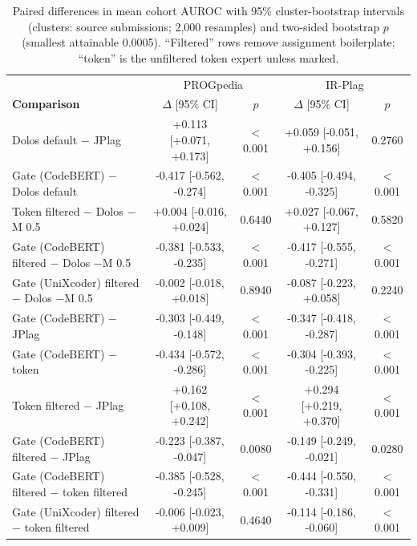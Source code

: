 \begin{table}[t]
\centering
\caption{Paired differences in mean cohort AUROC with 95\% cluster-bootstrap intervals (clusters: source submissions; 2,000 resamples) and two-sided bootstrap $p$ (smallest attainable 0.0005). ``Filtered'' rows remove assignment boilerplate; ``token'' is the unfiltered token expert unless marked.}
\label{tab:cohort-diff}
\footnotesize
\setlength{\tabcolsep}{3pt}
\begin{tabular}{l|cc|cc}
\toprule
 & \multicolumn{2}{c|}{PROGpedia} & \multicolumn{2}{c}{IR-Plag} \\
\textbf{Comparison} & $\Delta$ [95\% CI] & $p$ & $\Delta$ [95\% CI] & $p$ \\
\midrule
Dolos default $-$ JPlag & +0.113 [+0.071, +0.173] & $<$0.001 & +0.059 [-0.051, +0.156] & 0.2760 \\
Gate (CodeBERT) $-$ Dolos default & -0.417 [-0.562, -0.274] & $<$0.001 & -0.405 [-0.494, -0.325] & $<$0.001 \\
Token filtered $-$ Dolos $-$M 0.5 & +0.004 [-0.016, +0.024] & 0.6440 & +0.027 [-0.067, +0.127] & 0.5820 \\
Gate (CodeBERT) filtered $-$ Dolos $-$M 0.5 & -0.381 [-0.533, -0.235] & $<$0.001 & -0.417 [-0.555, -0.271] & $<$0.001 \\
Gate (UniXcoder) filtered $-$ Dolos $-$M 0.5 & -0.002 [-0.018, +0.018] & 0.8940 & -0.087 [-0.223, +0.058] & 0.2240 \\
Gate (CodeBERT) $-$ JPlag & -0.303 [-0.449, -0.148] & $<$0.001 & -0.347 [-0.418, -0.287] & $<$0.001 \\
Gate (CodeBERT) $-$ token & -0.434 [-0.572, -0.286] & $<$0.001 & -0.304 [-0.393, -0.225] & $<$0.001 \\
Token filtered $-$ JPlag & +0.162 [+0.108, +0.242] & $<$0.001 & +0.294 [+0.219, +0.370] & $<$0.001 \\
Gate (CodeBERT) filtered $-$ JPlag & -0.223 [-0.387, -0.047] & 0.0080 & -0.149 [-0.249, -0.021] & 0.0280 \\
Gate (CodeBERT) filtered $-$ token filtered & -0.385 [-0.528, -0.245] & $<$0.001 & -0.444 [-0.550, -0.331] & $<$0.001 \\
Gate (UniXcoder) filtered $-$ token filtered & -0.006 [-0.023, +0.009] & 0.4640 & -0.114 [-0.186, -0.060] & $<$0.001 \\
\bottomrule
\end{tabular}
\end{table}